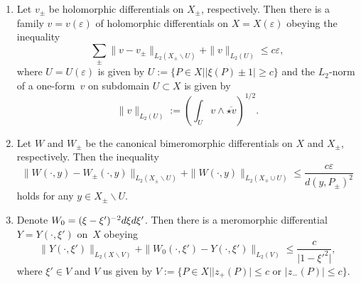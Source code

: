 \documentclass[10pt,a4paper]{amsart}
\begin{document}
\begin{Lemma}\label{Yamada lemma}\qquad
\begin{enumerate}\itemsep=0pt
\item[$(i)$] Let $v_\pm$ be holomorphic differentials on $X_\pm$, respectively. Then there is a family $v=v(\varepsilon)$ of holomorphic differentials on $X=X(\varepsilon)$ obeying the inequality
\begin{equation}
\label{Yamada est}
\sum_{\pm}\|v-v_\pm\|_{L_2(X_\pm\backslash U)}+\|v\|_{L_2(U)}\le c\varepsilon,
\end{equation}
where $U=U(\varepsilon)$ is given by
$U:=\{P\in X | |\xi(P)\pm 1|\ge c\}$
and the $L_2$-norm of a one-form~$v$ on subdomain $U\subset X$ is given by
\[\|v\|_{L_2(U)}:=\left(\int_{U}v\wedge\overline{\star v}\right)^{1/2}.\]
\item[$(ii)$] Let $W$ and $W_\pm$ be the canonical bimeromorphic differentials on $X$ and $X_\pm$, respectively. Then the inequality
\begin{equation}
\label{Yamada est merom}
\|W(\cdot,y)-W_\pm(\cdot,y)\|_{L_2(X_\pm\backslash U)}+\|W(\cdot,y)\|_{L_2(X_\mp\cup U)}\le \frac{c\varepsilon}{ d(y,P_\pm)^2}
\end{equation}
holds for any $y\in X_\pm\backslash U$.
\item[$(iii)$] Denote $W_0=(\xi-\xi')^{-2}{\rm d}\xi {\rm d}\xi'$. Then there is a meromorphic differential $Y=Y(\cdot,\xi')$ on~$X$ obeying
\begin{equation}
\label{Yamada est on pinch}
\|Y(\cdot,\xi')\|_{L_2(X\backslash V)}+\|W_0(\cdot,\xi')-Y(\cdot,\xi')\|_{L_2(V)}\le \frac{c}{\big|1-\xi'^2\big|},
\end{equation}
where $\xi'\in V$ and $V$ us given by
$V:=\{P\in X | |z_+(P)|\le c \text{ or } |z_-(P)|\le c\}$.
\end{enumerate}
\end{Lemma}
\end{document}

